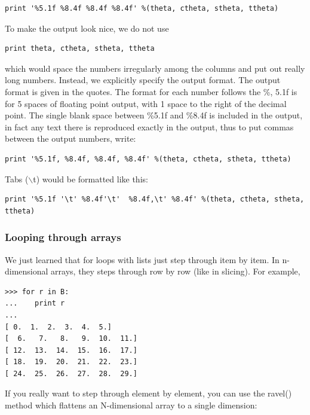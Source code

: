 \documentclass[11pt]{book}
\begin{document}
{{{ \color{blue} \begin{verbatim}
print '%5.1f %8.4f %8.4f %8.4f' %(theta, ctheta, stheta, ttheta)
\end{verbatim}}

\noindent To make the output look nice, we do not use

{ \color{blue} \begin{verbatim}
print theta, ctheta, stheta, ttheta
\end{verbatim}}

\noindent which would space the numbers irregularly among the columns and put out really long numbers.  Instead,
we explicitly specify the output format.   The output format is given in the quotes.  The format for each
number follows the \%, 5.1f is for 5 spaces of floating point output, with 1
space to the right of the decimal point.  The single
blank space between \%5.1f and \%8.4f is included in the output, in fact any
text there is reproduced exactly in the output, thus to put commas between
the output numbers, write:

{ \color{blue} \begin{verbatim}
print '%5.1f, %8.4f, %8.4f, %8.4f' %(theta, ctheta, stheta, ttheta)
\end{verbatim}}

\noindent Tabs ($\backslash$t) would be formatted like this:

{ \color{blue} \begin{verbatim}
print '%5.1f '\t' %8.4f'\t'  %8.4f,\t' %8.4f' %(theta, ctheta, stheta, ttheta)
\end{verbatim}  }

 \subsubsection{Looping through arrays}

We just learned that  {\color{blue} for} loops with lists  just step through item by item.  In n-dimensional arrays, they steps through row by row (like in slicing).  For example,


{ \color{blue} \begin{verbatim}
>>> for r in B:
...    print r
...
[ 0.  1.  2.  3.  4.  5.]
[  6.   7.   8.   9.  10.  11.]
[ 12.  13.  14.  15.  16.  17.]
[ 18.  19.  20.  21.  22.  23.]
[ 24.  25.  26.  27.  28.  29.]
\end{verbatim}}

If you really want to step through element by element, you can use the {\color{blue}ravel()} method which flattens an N-dimensional array to a single dimension:

}}
\end{document}
